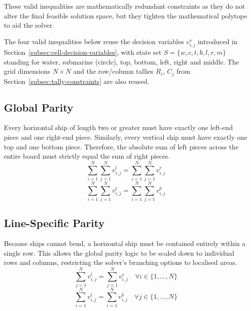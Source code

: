 These valid inequalities are mathematically redundant constraints as they do not alter the final feasible solution space, but they tighten the mathematical polytope to aid the solver.

The four valid inequalities below reuse the decision variables $v_{i,j}^s$ introduced in Section~\ref{subsec:cell-decision-variables}, with state set $S = \{w, c, t, b, l, r, m\}$ standing for water, submarine (circle), top, bottom, left, right and middle. The grid dimensions $N \times N$ and the row/column tallies $R_i$, $C_j$ from Section~\ref{subsec:tally-constraints} are also reused.

\subsection{Global Parity}\label{subsec:global-parity}
Every horizontal ship of length two or greater must have exactly one left-end piece and one right-end piece. Similarly, every vertical ship must have exactly one top and one bottom piece. Therefore, the absolute sum of left pieces across the entire board must strictly equal the sum of right pieces.
\begin{equation}
    \sum_{i=1}^{N} \sum_{j=1}^{N} v_{i,j}^l = \sum_{i=1}^{N} \sum_{j=1}^{N} v_{i,j}^r
\end{equation}
\begin{equation}
    \sum_{i=1}^{N} \sum_{j=1}^{N} v_{i,j}^t = \sum_{i=1}^{N} \sum_{j=1}^{N} v_{i,j}^b
\end{equation}

\subsection{Line-Specific Parity}\label{subsec:line-specific-parity}
Because ships cannot bend, a horizontal ship must be contained entirely within a single row. This allows the global parity logic to be scaled down to individual rows and columns, restricting the solver's branching options to localised areas.
\begin{equation}
    \sum_{j=1}^{N} v_{i,j}^l = \sum_{j=1}^{N} v_{i,j}^r \quad \forall i \in \{1, \dots, N\}
\end{equation}
\begin{equation}
    \sum_{i=1}^{N} v_{i,j}^t = \sum_{i=1}^{N} v_{i,j}^b \quad \forall j \in \{1, \dots, N\}
\end{equation}

